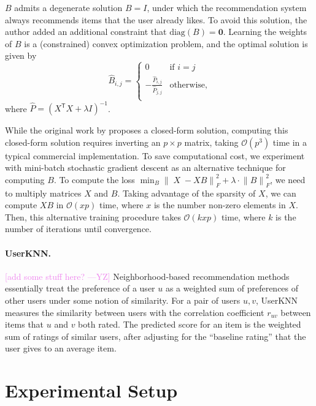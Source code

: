 \documentclass{article}
\DeclareMathOperator{\X}{\mathit{X}}
\newcommand{\userknn}{UserKNN\xspace}
\newcommand{\norm}[1]{\ensuremath{\lVert #1 \rVert}}
\newcommand{\transpose}[1]{{#1}^\mathsf{T}}
\newcommand{\yiming}[1]{\textcolor{violet}{[#1 ---\textsc{YZ}]}}
\begin{document}
$B$ admits a degenerate solution $B = I$, under which the
recommendation system always recommends items that the user
already likes.
To avoid this solution, the author added an additional constraint that
 $\mathrm{diag}(B) = \mathbf{0}$.
Learning the weights of $B$ is a (constrained) convex optimization problem, and
 the optimal solution is given by  \begin{equation} \hat{B}_{i, j} =
	 \begin{cases} 0 & \text{if $i = j$} \\ -\frac{\hat{P}_{i, j}}{\hat{P}_{j, j}} &
               \text{otherwise,}     \\\end{cases} \end{equation} where $\hat{P} =
	 (\transpose{X} X + \lambda I)^{-1}$.

While the original work by \citet{steckEmbarrassinglyShallowAutoencoders2019}
 proposes a closed-form solution, computing this closed-form solution requires
 inverting an $p \times p$ matrix, taking $\mathcal{O}(p^3)$ time in a typical
 commercial implementation.
To save computational cost, we experiment with mini-batch stochastic gradient
 descent as an alternative technique for computing $B$.
To compute the loss $\min_B \norm{\X - X B}_F^2 + \lambda \cdot \norm{B}_F^2$,
 we need to multiply matrices $X$ and $B$.
Taking advantage of the sparsity of $X$, we can compute $X B$ in $\mathcal{O}(x
	 p)$ time, where $x$ is the number non-zero elements in $X$.
Then, this alternative training procedure takes $\mathcal{O}(kxp)$ time, where
 $k$ is the number of iterations until convergence.

\paragraph*{\userknn.}
\yiming{add some stuff here?}
Neighborhood-based recommendation methods essentially treat the preference of a
 user $u$ as a weighted sum of preferences of other users under some notion of
 similarity.
For a pair of users $u, v$,
 \userknn~\citep{resnickGroupLensOpenArchitecture1994} measures the similarity
 between users with the correlation coefficient $r_{uv}$ between items that $u$
 and $v$ both rated.
The predicted score for an item is the weighted sum of ratings of similar
 users, after adjusting for the ``baseline rating'' that the user gives to an
 average item.

\section{Experimental Setup}
\end{document}
